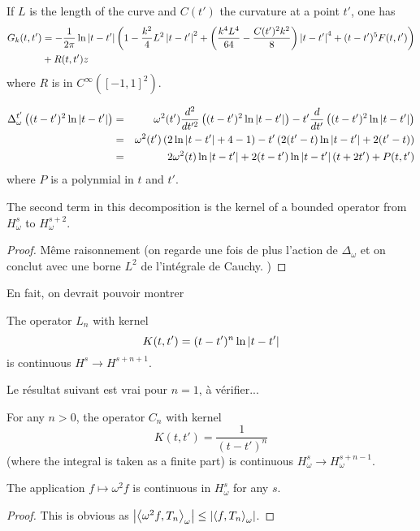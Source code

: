 \documentclass[]{article}
\begin{document}
\begin{Lem} If $L$ is the length of the curve and $C(t')$ the curvature at a point $t'$, one has
	\begin{align*}G_k(t,t') &= -\frac{1}{2\pi} \ln|t-t'|\left(1 - \frac{k^2}{4}L^2\left\lvert t-t' \right\rvert^2 + \left(\frac{k^4L^4}{64} -\frac{C(t')^2k^2}{8}\right)\left\lvert t-t' \right\rvert^4 + (t-t')^5 F(t,t')\right)\\
	 &+ R(t,t')
z	 \end{align*}
	 where $R$ is in $C^{\infty}([-1,1]^2)$.
\end{Lem}

\begin{Lem}
	\begin{eqnarray*}
		\Delta_{\omega}^{t'} \left((t-t')^2\ln\left\lvert t-t' \right\rvert\right) &=& \omega^2(t')\frac{d^2}{dt'^2}\left((t-t')^2\ln\left\lvert t-t' \right\rvert\right) - t' \frac{d}{dt'} \left((t-t')^2\ln\left\lvert t-t' \right\rvert\right)\\
		&=&\omega^2(t')\left(2\ln\left\lvert t-t' \right\rvert + 4 - 1\right) - t'\left(2(t'-t)\ln\left\lvert t-t' \right\rvert + 2(t'-t)\right)\\
		&=&2\omega^2(t)\ln\left\lvert t-t' \right\rvert + 2(t-t')\ln\left\lvert t-t' \right\rvert(t + 2t') + P(t,t')
	\end{eqnarray*}
	where $P$ is a polynmial in $t$ and $t'$. 
\end{Lem}
\begin{Lem}
	The second term in this decomposition is the kernel of a bounded operator from $H^s_{\omega}$ to $H^{s+2}_{\omega}$.
	\begin{proof}
		Même raisonnement (on regarde une fois de plus l'action de $\Delta_\omega$ et on conclut avec une borne $L^2$ de l'intégrale de Cauchy. )
	\end{proof}
\end{Lem}
En fait, on devrait pouvoir montrer
\begin{Lem}
	The operator $L_n$ with kernel
	\[K(t,t') = (t-t')^n\ln\left\lvert t-t' \right\rvert\]
	is continuous $H^s \to H^{s + n + 1}$.
\end{Lem}
Le résultat suivant est vrai pour $n=1$, à vérifier...
\begin{Conj}
	For any $n>0$, the operator $C_n$ with kernel
	\[K(t,t') = \frac{1}{(t-t')^n}\]
	(where the integral is taken as a finite part) is continuous $H^s_{\omega} \to H^{s+n-1}_{\omega}$. 
\end{Conj}
\begin{Lem}
	The application $f \mapsto \omega^2 f$ is continuous in $H^s_{\omega}$ for any $s$. 
	\begin{proof}
		This is obvious as $\left\lvert \left\langle \omega^2f,T_n\right\rangle_{\omega} \right\rvert \leq  \left\lvert \left\langle f,T_n\right\rangle_{\omega} \right\rvert$.
	\end{proof}
\end{Lem}
\end{document}
